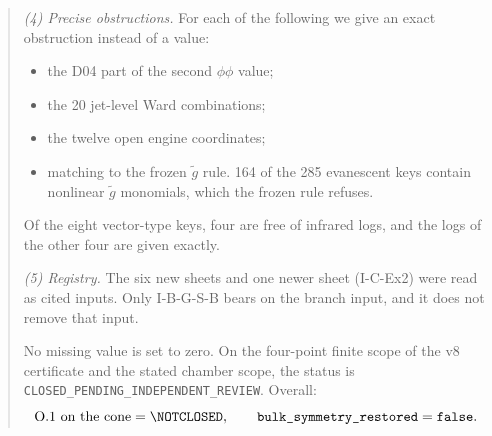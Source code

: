 \begin{abstract}
\emph{(4) Precise obstructions.} For each of the following we give
an exact obstruction instead of a value:
\begin{itemize}
\item the D04 part of the second \(\phi\phi\) value;
\item the 20 jet-level Ward combinations;
\item the twelve open engine coordinates;
\item matching to the frozen \(\tilde g\) rule. 164 of the 285
evanescent keys contain nonlinear \(\tilde g\) monomials, which
the frozen rule refuses.
\end{itemize}
Of the eight vector-type keys, four are free of infrared logs, and
the logs of the other four are given exactly.

\emph{(5) Registry.} The six new sheets and one newer sheet
(I-C-Ex2) were read as cited inputs. Only I-B-G-S-B bears on the
branch input, and it does not remove that input.

No missing value is set to zero. On the four-point finite scope of
the v8 certificate and the stated chamber scope, the status is
\texttt{CLOSED\_PENDING\_}\allowbreak\texttt{INDEPENDENT\_REVIEW}.
Overall:
\[
 \text{O.1 on the cone}=\NOTCLOSED,\qquad
 \texttt{bulk\_symmetry\_restored}=\texttt{false}.
\]
\end{abstract}
